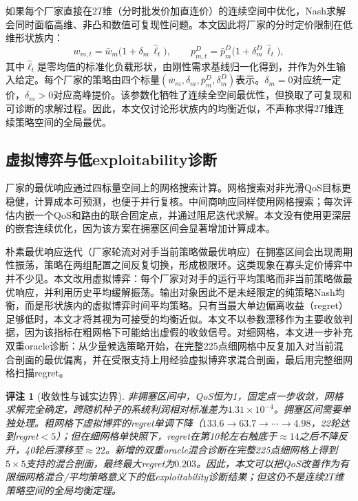 \documentclass[UTF8,11pt]{ctexart}
\newtheorem{remark}{评注}
\begin{document}
如果每个厂家直接在$2T$维（分时批发价加直连价）的连续空间中优化，Nash求解会同时面临高维、非凸和数值可复现性问题。本文因此将厂家的分时定价限制在低维形状族内：
\begin{equation}
  w_{m,t}=\bar w_m\big(1+\delta_m\,\widehat{\ell}_t\big),\qquad
  p^D_{m,t}=\bar p^D_m\big(1+\delta^D_m\,\widehat{\ell}_t\big),
  \label{eq:shape}
\end{equation}
其中$\widehat{\ell}_t$是零均值的标准化负载形状，由刚性需求基线归一化得到，并作为外生输入给定。每个厂家的策略由四个标量$(\bar w_m,\delta_m,\bar p^D_m,\delta^D_m)$表示。$\delta_m=0$对应统一定价，$\delta_m>0$对应高峰提价。该参数化牺牲了连续全空间最优性，但换取了可复现和可诊断的求解过程。因此，本文仅讨论形状族内的均衡近似，不声称求得$2T$维连续策略空间的全局最优。

\subsection{虚拟博弈与低exploitability诊断}

厂家的最优响应通过四标量空间上的网格搜索计算。网格搜索对非光滑QoS目标更稳健，计算成本可预测，也便于并行复核。中间商响应同样使用网格搜索；每次评估内嵌一个QoS和路由的联合固定点，并通过阻尼迭代求解。本文没有使用更深层的嵌套连续优化，因为该方案在拥塞区间会显著增加计算成本。

朴素最优响应迭代（厂家轮流对对手当前策略做最优响应）在拥塞区间会出现周期性振荡，策略在两组配置之间反复切换，形成极限环。这类现象在寡头定价博弈中并不少见。本文改用虚拟博弈：每个厂家对对手的运行平均策略而非当前策略做最优响应，并利用历史平均缓解振荡。输出对象因此不是未经限定的纯策略Nash均衡，而是形状族内的虚拟博弈时间平均策略。只有当最大单边偏离收益（regret）足够低时，本文才将其视为可接受的均衡近似。本文不以参数漂移作为主要收敛判据，因为该指标在粗网格下可能给出虚假的收敛信号。对细网格，本文进一步补充双重oracle诊断：从少量候选策略开始，在完整225点细网格中反复加入对当前混合剖面的最优偏离，并在受限支持上用经验虚拟博弈求混合剖面，最后用完整细网格扫描regret。

\begin{remark}[收敛性与诚实边界]
非拥塞区间中，QoS恒为1，固定点一步收敛，网格求解完全确定，跨随机种子的系统利润相对标准差为$4.31\times10^{-4}$。拥塞区间需要单独处理。粗网格下虚拟博弈的regret单调下降（$133.6\to63.7\to\cdots\to4.98$，22轮达到regret$<5$）；但在细网格单快照下，regret在第10轮左右触底于$\approx14$之后不降反升，40轮后漂移至$\approx22$。新增的双重oracle混合诊断在完整225点细网格上得到$5\times5$支持的混合剖面，最终最大regret为$0.203$。因此，本文可以把QoS改善作为有限细网格混合/平均策略意义下的低exploitability诊断结果；但这仍不是连续$2T$维策略空间的全局均衡定理。
\end{remark}
\end{document}
